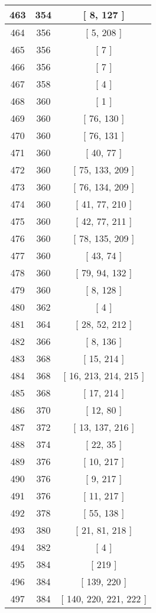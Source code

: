 \begin{center}
\begin{longtable}[H]{|| c c c ||}
\hline
463 & 354 & [ 8, 127 ] \\ 
\hline
464 & 356 & [ 5, 208 ] \\ 
\hline
465 & 356 & [ 7 ] \\ 
\hline
466 & 356 & [ 7 ] \\ 
\hline
467 & 358 & [ 4 ] \\ 
\hline
468 & 360 & [ 1 ] \\ 
\hline
469 & 360 & [ 76, 130 ] \\ 
\hline
470 & 360 & [ 76, 131 ] \\ 
\hline
471 & 360 & [ 40, 77 ] \\ 
\hline
472 & 360 & [ 75, 133, 209 ] \\ 
\hline
473 & 360 & [ 76, 134, 209 ] \\ 
\hline
474 & 360 & [ 41, 77, 210 ] \\ 
\hline
475 & 360 & [ 42, 77, 211 ] \\ 
\hline
476 & 360 & [ 78, 135, 209 ] \\ 
\hline
477 & 360 & [ 43, 74 ] \\ 
\hline
478 & 360 & [ 79, 94, 132 ] \\ 
\hline
479 & 360 & [ 8, 128 ] \\ 
\hline
480 & 362 & [ 4 ] \\ 
\hline
481 & 364 & [ 28, 52, 212 ] \\ 
\hline
482 & 366 & [ 8, 136 ] \\ 
\hline
483 & 368 & [ 15, 214 ] \\ 
\hline
484 & 368 & [ 16, 213, 214, 215 ] \\ 
\hline
485 & 368 & [ 17, 214 ] \\ 
\hline
486 & 370 & [ 12, 80 ] \\ 
\hline
487 & 372 & [ 13, 137, 216 ] \\ 
\hline
488 & 374 & [ 22, 35 ] \\ 
\hline
489 & 376 & [ 10, 217 ] \\ 
\hline
490 & 376 & [ 9, 217 ] \\ 
\hline
491 & 376 & [ 11, 217 ] \\ 
\hline
492 & 378 & [ 55, 138 ] \\ 
\hline
493 & 380 & [ 21, 81, 218 ] \\ 
\hline
494 & 382 & [ 4 ] \\ 
\hline
495 & 384 & [ 219 ] \\ 
\hline
496 & 384 & [ 139, 220 ] \\ 
\hline
497 & 384 & [ 140, 220, 221, 222 ] \\ 

\end{longtable}
\end{center}
